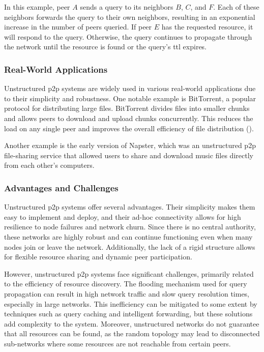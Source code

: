 In this example, peer $A$ sends a query to its neighbors $B$, $C$, and $F$.
Each of these neighbors forwards the query to their own neighbors, resulting in an exponential increase in the number of peers queried.
If peer $E$ has the requested resource, it will respond to the query.
Otherwise, the query continues to propagate through the network until the resource is found or the query's \gls{ttl} expires.

\subsubsection*{Real-World Applications}
Unstructured \gls{p2p} systems are widely used in various real-world applications due to their simplicity and robustness.
One notable example is BitTorrent, a popular protocol for distributing large files.
BitTorrent divides files into smaller chunks and allows peers to download and upload chunks concurrently.
This reduces the load on any single peer and improves the overall efficiency of file distribution (\cite{cohen2003incentives}).

Another example is the early version of Napster, which was an unstructured \gls{p2p} file-sharing service that allowed users to share and download music files directly from each other's computers.

\subsubsection*{Advantages and Challenges}
Unstructured \gls{p2p} systems offer several advantages.
Their simplicity makes them easy to implement and deploy, and their ad-hoc connectivity allows for high resilience to node failures and network churn.
Since there is no central authority, these networks are highly robust and can continue functioning even when many nodes join or leave the network.
Additionally, the lack of a rigid structure allows for flexible resource sharing and dynamic peer participation.

However, unstructured \gls{p2p} systems face significant challenges, primarily related to the efficiency of resource discovery.
The flooding mechanism used for query propagation can result in high network traffic and slow query resolution times, especially in large networks.
This inefficiency can be mitigated to some extent by techniques such as query caching and intelligent forwarding, but these solutions add complexity to the system.
Moreover, unstructured networks do not guarantee that all resources can be found, as the random topology may lead to disconnected sub-networks where some resources are not reachable from certain peers.

